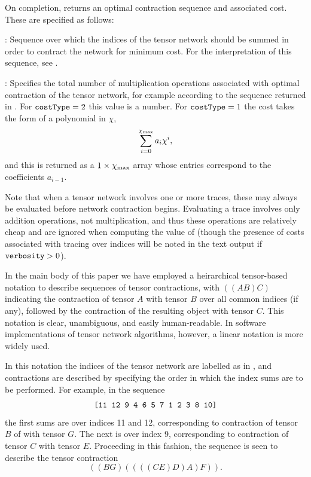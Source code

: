 On completion,  returns an optimal contraction sequence and associated cost. These are specified as follows:

: Sequence over which the indices of the tensor network should be summed in order to contract the network for minimum cost. For the interpretation of this sequence, see .

: Specifies the total number of multiplication operations associated with optimal contraction of the tensor network, for example according to the sequence returned in . For $\texttt{costType}=2$ this value is a number. For $\texttt{costType}=1$ the cost takes the form of a polynomial in $\chi$,
\begin{equation}
\sum_{i=0}^{\chi_{\mathrm{max}}}a_i\chi^i,
\end{equation}
and this is returned as a $1\times \chi_{\mathrm{max}}$ array whose entries  correspond to the coefficients $a_{i-1}$. %

Note that when a tensor network involves one or more traces, these may always be evaluated before network contraction begins. Evaluating a trace involves only addition operations, not multiplication, and thus these operations are relatively cheap and are ignored when computing the value of  (though the presence of costs associated with tracing over indices will be noted in the text output if $\texttt{verbosity}>0$). %


In the main body of this paper we have employed a heirarchical tensor-based notation to describe sequences of tensor contractions, with $((AB)C)$ indicating the contraction of tensor $A$ with tensor $B$ over all common indices (if any), followed by the contraction of the resulting object with tensor $C$. This notation is clear, unambiguous, and easily human-readable. In software implementations of tensor network algorithms, however, a linear notation is more widely used.

In this notation the indices of the tensor network are labelled as in , and contractions are described by specifying the order in which the index sums are to be performed. For example, in the sequence
\begin{equation}
\texttt{[11 12 9 4 6 5 7 1 2 3 8 10]}
\end{equation}
the first sums are over indices 11 and 12, corresponding to contraction of tensor $B$ of  with tensor $G$. The next is over index 9, corresponding to contraction of tensor $C$ with tensor $E$. Proceeding in this fashion, the sequence is seen to describe the tensor contraction
\begin{equation}
((BG)((((CE)D)A)F)).
\end{equation}

